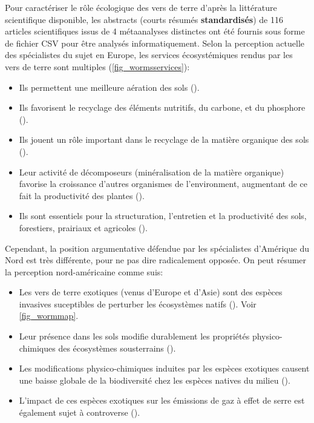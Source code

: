 \documentclass{book}
\begin{document}
\noindent
Pour caractériser le rôle écologique des vers de terre d'après la littérature scientifique disponible, les abstracts (courts résumés \textbf{standardisés}) de 116 articles scientifiques issus de 4 métaanalyses distinctes ont été fournis sous forme de fichier CSV pour être analysés informatiquement. Selon la perception actuelle des spécialistes du sujet en Europe, les services écosystémiques rendus par les vers de terre sont multiples (\cref{fig_wormsservices})\cite{11_EW_benefits_summary}:

{
\renewcommand{\labelitemi}{\textbullet}
\begin{itemize}
    \item Ils permettent une meilleure aération des sols (\cite{1_aeration_sols}).
    \item Ils favorisent le recyclage des éléments nutritifs, du carbone, et du phosphore (\cite{2_recyclage_elements_nutri}).
    \item Ils jouent un rôle important dans le recyclage de la matière organique des sols (\cite{3_recyclage_matiere_orga}).
    \item Leur activité de décomposeurs (minéralisation de la matière organique) favorise la croissance d'autres organismes de l'environment, augmentant de ce fait la productivité des plantes (\cite{4_augmentation_productivite_revue}).
    \item Ils sont essentiels pour la structuration, l’entretien et la productivité des sols, forestiers, prairiaux et agricoles (\cite{5_structuration_des_sols}).
\end{itemize}
} %

\noindent
Cependant, la position argumentative défendue par les spécialistes d'Amérique du Nord est très différente, pour ne pas dire radicalement opposée. On peut résumer la perception nord-américaine comme suis: 

{
\renewcommand{\labelitemi}{\textbullet}
\begin{itemize}
    \item Les vers de terre exotiques (venus d'Europe et d'Asie) sont des espèces invasives suceptibles de perturber les écosystèmes natifs (\cite{6_invasion_vers_de_terre}). Voir \cref{fig_wormmap}.
    \item Leur présence dans les sols modifie durablement les propriétés physico-chimiques des écosystèmes sousterrains (\cite{7_EW_change_soil_chemical_properties}).
    \item Les modifications physico-chimiques induites par les espèces exotiques causent une baisse globale de la biodiversité chez les espèces natives du milieu (\cite{8_EW_erode_soil_biodiversity}).
    \item L'impact de ces espèces exotiques sur les émissions de gaz à effet de serre est également sujet à controverse (\cite{9_EW_effet_serre,10_EW_pas_effet_de_serre}).
\end{itemize}
}
\end{document}
